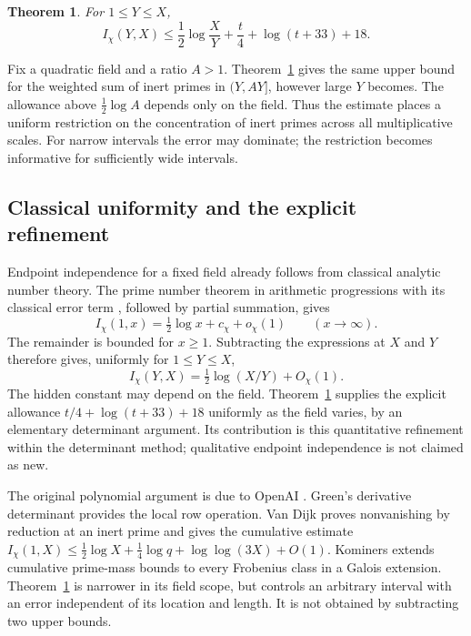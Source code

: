 \documentclass[11pt]{article}
\newtheorem{theorem}{Theorem}
\begin{document}
\begin{theorem}\label{thm:interval}
For $1\le Y\le X$,
\begin{equation}\label{eq:main}
 I_\chi(Y,X)\le\frac12\log\frac XY+\frac t4+\log(t+33)+18.
\end{equation}
\end{theorem}

Fix a quadratic field and a ratio $A>1$. Theorem~\ref{thm:interval}
gives the same upper bound for the weighted sum of inert primes in
$(Y,AY]$, however large $Y$ becomes. The allowance above
$\tfrac12\log A$ depends only on the field. Thus the estimate places
a uniform restriction on the concentration of inert primes across
all multiplicative scales. For narrow intervals the error may dominate;
the restriction becomes informative for sufficiently wide intervals.

\subsection{Classical uniformity and the explicit refinement}
Endpoint independence for a fixed field already follows from classical
analytic number theory. The prime number theorem in arithmetic
progressions with its classical error term
\cite[Chapter 11]{kedlaya}, followed by partial summation, gives
\[
 I_\chi(1,x)=\tfrac12\log x+c_\chi+o_\chi(1)
 \qquad(x\to\infty).
\]
The remainder is bounded for $x\ge1$. Subtracting the expressions at
$X$ and $Y$ therefore gives, uniformly for $1\le Y\le X$,
\[
 I_\chi(Y,X)=\tfrac12\log(X/Y)+O_\chi(1).
\]
The hidden constant may depend on the field. Theorem~\ref{thm:interval}
supplies the explicit allowance $t/4+\log(t+33)+18$ uniformly as the
field varies, by an elementary determinant argument. Its contribution
is this quantitative refinement within the determinant method;
qualitative endpoint independence is not claimed as new.

The original polynomial argument is due to OpenAI \cite{openai}.
Green's derivative determinant \cite{green} provides the local row
operation. Van Dijk \cite{vandijk} proves nonvanishing by reduction at
an inert prime and gives the cumulative estimate
$I_\chi(1,X)\le\frac12\log X+\frac14\log q+
\log\log(3X)+O(1)$. Kominers \cite{kominers} extends cumulative
prime-mass bounds to every Frobenius class in a Galois extension.
Theorem~\ref{thm:interval} is narrower in its field scope, but controls
an arbitrary interval with an error independent of its location and
length. It is not obtained by subtracting two upper bounds.
\end{document}
